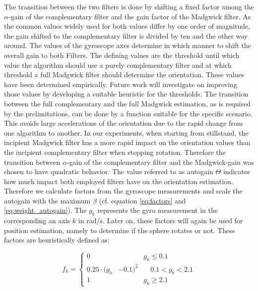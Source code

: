 \documentclass[letterpaper, 10 pt, conference]{ieeeconf}  %
\begin{document}
The transition between the two filters is done by shifting a fixed factor among the $\alpha$-gain of the complementary filter and the gain factor of the Madgwick filter.
 As the common values widely used for both values differ by one order of magnitude, the gain shifted to the complementary filter is divided by ten and the other way around.
 The values of the gyroscope axes determine in which manner to shift the overall gain to both Filters. 
 The defining values are the threshold until which value the algorithm should use a purely complementary filter and at which threshold a full Madgwick filter should determine the orientation. 
 These values have been determined empirically.
 Future work will investigate on improving those values by developing a suitable heuristic for the thresholds.
 The transition between the full complementary and the full Madgwick estimation, as is required by the prelimitations,  can be done by a function suitable for the specific scenario.
 This avoids large accelerations of the orientation due to the rapid change from one algorithm to another.
 In our experiments, when starting from stillstand, the incipient Madgwick filter has a more rapid impact on the orientation values than the incipient complementary filter when stopping rotation. 
Therefore the transition between $\alpha$-gain of the complementary filter and the Madgwick-gain was chosen to have quadratic behavior. 
The value referred to as autogain $\Theta$ indicates how much impact both employed filters have on the orientation estimation. 
Therefore we calculate factors from the gyroscope measurements and scale the autogain with the maximum $\beta$ (cf. equation \ref{eq:factors} and \ref{eq:weight_autogain}).
The $g_{k}$ represents the gyro measurement in the corresponding an axis $k$ in rad/s. Later on, these factors will again be used for position estimation, namely to determine if the sphere rotates or not.
These factors are heuristically defined as:

\begin{equation}
f_k =
\left\{
\begin{aligned}
0& & g_k \leq 0.1  \\ 
0.25\cdot (g_x&-0.1)^2& \quad 0.1< g_k <2.1 \\
 1& & g_k \geq 2.1
\end{aligned}
\label{eq:factors}
\right.
\end{equation}
\end{document}
